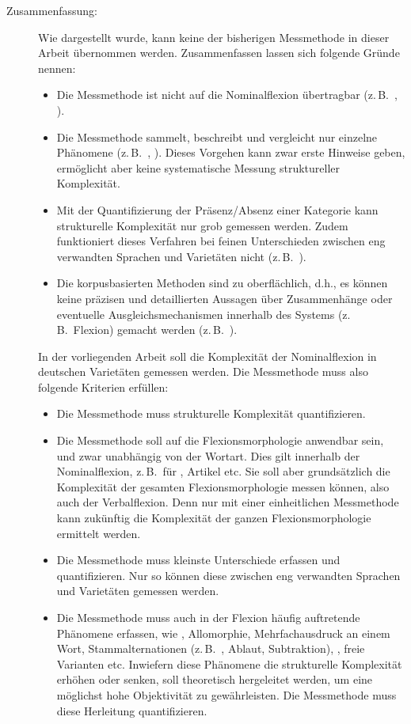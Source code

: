 \begin{exe}
\begin{exe}
\begin{description}
\item[Zusammenfassung:] Wie dargestellt wurde, kann keine der bisherigen Messmethode in dieser Arbeit übernommen werden. Zusammenfassen lassen sich folgende Gründe nennen:

\begin{itemize}
\item 
Die Messmethode ist nicht auf die Nominalflexion übertragbar (z.\,B.\ \citealt{Shosted2006}, \citealt{Garzonio2016}).
\item 
Die Messmethode sammelt, beschreibt und vergleicht nur einzelne Phänomene (z.\,B.\ \citealt{McWhorter2001}, \citealt{Schreier2016}). Dieses Vorgehen kann zwar erste Hinweise geben, ermöglicht aber keine systematische Messung struktureller Komplexität.
\item 
Mit der Quantifizierung der Präsenz/Absenz einer Kategorie kann strukturelle Komplexität nur grob gemessen werden. Zudem funktioniert dieses Verfahren bei feinen Unterschieden zwischen eng verwandten Sprachen und Varietäten nicht (z.\,B.\ \citealt{Nichols2009}).
\item 
Die korpusbasierten Methoden sind zu oberflächlich, d.h., es können keine präzisen und detaillierten Aussagen über Zusammenhänge oder eventuelle Ausgleichsmechanismen innerhalb des Systems (z.\,B.\ Flexion) gemacht werden (z.\,B.\ \citealt{EhretSzmrecsanyi2016}).
\end{itemize}

\noindent
In der vorliegenden Arbeit soll die Komplexität der Nominalflexion in deutschen Varietäten gemessen werden. Die Messmethode muss also folgende Kriterien erfüllen:

\begin{itemize}
\item 
Die Messmethode muss strukturelle Komplexität quantifizieren.
\item 
Die Messmethode soll auf die Flexionsmorphologie anwendbar sein, und zwar unabhängig von der Wortart. Dies gilt innerhalb der Nominalflexion, z.\,B.\ für , Artikel etc. Sie soll aber grundsätzlich die Komplexität der gesamten Flexionsmorphologie messen können, also auch der Verbalflexion. Denn nur mit einer einheitlichen Messmethode kann zukünftig die Komplexität der ganzen Flexionsmorphologie ermittelt werden.
\item 
Die Messmethode muss kleinste Unterschiede erfassen und quantifizieren. Nur so können diese zwischen eng verwandten Sprachen und Varietäten gemessen werden.
\item 
Die Messmethode muss auch in der Flexion häufig auftretende Phänomene erfassen, wie , Allomorphie, Mehrfachausdruck an einem Wort, Stammalternationen (z.\,B.\ , Ablaut, Subtraktion), , freie Varianten etc. Inwiefern diese Phänomene die strukturelle Komplexität erhöhen oder senken, soll theoretisch hergeleitet werden, um eine möglichst hohe Objektivität zu gewährleisten. Die Messmethode muss diese Herleitung quantifizieren.
\end{itemize}
\end{description}


\end{exe}
\end{exe}
